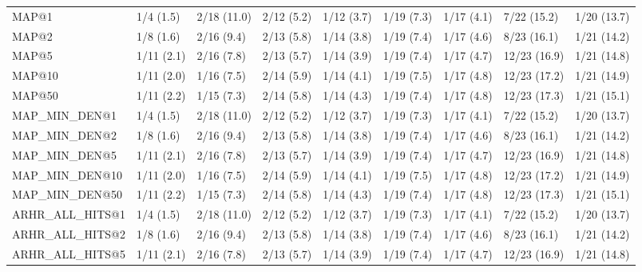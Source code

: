 \begin{tabular}{lllllllll}
MAP@1                       &      1/4 (1.5) &    2/18 (11.0) &    2/12 (5.2) &    1/12 (3.7) &  1/19 (7.3) &   1/17 (4.1) &    7/22 (15.2) &        1/20 (13.7) \\
MAP@2                       &      1/8 (1.6) &     2/16 (9.4) &    2/13 (5.8) &    1/14 (3.8) &  1/19 (7.4) &   1/17 (4.6) &    8/23 (16.1) &        1/21 (14.2) \\
MAP@5                       &     1/11 (2.1) &     2/16 (7.8) &    2/13 (5.7) &    1/14 (3.9) &  1/19 (7.4) &   1/17 (4.7) &   12/23 (16.9) &        1/21 (14.8) \\
MAP@10                      &     1/11 (2.0) &     1/16 (7.5) &    2/14 (5.9) &    1/14 (4.1) &  1/19 (7.5) &   1/17 (4.8) &   12/23 (17.2) &        1/21 (14.9) \\
MAP@50                      &     1/11 (2.2) &     1/15 (7.3) &    2/14 (5.8) &    1/14 (4.3) &  1/19 (7.4) &   1/17 (4.8) &   12/23 (17.3) &        1/21 (15.1) \\
MAP_MIN_DEN@1               &      1/4 (1.5) &    2/18 (11.0) &    2/12 (5.2) &    1/12 (3.7) &  1/19 (7.3) &   1/17 (4.1) &    7/22 (15.2) &        1/20 (13.7) \\
MAP_MIN_DEN@2               &      1/8 (1.6) &     2/16 (9.4) &    2/13 (5.8) &    1/14 (3.8) &  1/19 (7.4) &   1/17 (4.6) &    8/23 (16.1) &        1/21 (14.2) \\
MAP_MIN_DEN@5               &     1/11 (2.1) &     2/16 (7.8) &    2/13 (5.7) &    1/14 (3.9) &  1/19 (7.4) &   1/17 (4.7) &   12/23 (16.9) &        1/21 (14.8) \\
MAP_MIN_DEN@10              &     1/11 (2.0) &     1/16 (7.5) &    2/14 (5.9) &    1/14 (4.1) &  1/19 (7.5) &   1/17 (4.8) &   12/23 (17.2) &        1/21 (14.9) \\
MAP_MIN_DEN@50              &     1/11 (2.2) &     1/15 (7.3) &    2/14 (5.8) &    1/14 (4.3) &  1/19 (7.4) &   1/17 (4.8) &   12/23 (17.3) &        1/21 (15.1) \\
ARHR_ALL_HITS@1             &      1/4 (1.5) &    2/18 (11.0) &    2/12 (5.2) &    1/12 (3.7) &  1/19 (7.3) &   1/17 (4.1) &    7/22 (15.2) &        1/20 (13.7) \\
ARHR_ALL_HITS@2             &      1/8 (1.6) &     2/16 (9.4) &    2/13 (5.8) &    1/14 (3.8) &  1/19 (7.4) &   1/17 (4.6) &    8/23 (16.1) &        1/21 (14.2) \\
ARHR_ALL_HITS@5             &     1/11 (2.1) &     2/16 (7.8) &    2/13 (5.7) &    1/14 (3.9) &  1/19 (7.4) &   1/17 (4.7) &   12/23 (16.9) &        1/21 (14.8) \\

\end{tabular}
